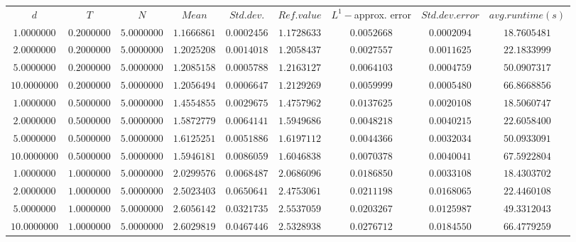 \begin{tabular}{ccccccccc}
$d$ & $T$ & $N$ & $Mean$ & $Std. dev.$ & $Ref. value$ & $L^1-$approx. error & $Std. dev. error$ & $avg. runtime (s)$\\
$1.0000000$ & $0.2000000$ & $5.0000000$ & $1.1666861$ & $0.0002456$ & $1.1728633$ & $0.0052668$ & $0.0002094$ & $18.7605481$\\
$2.0000000$ & $0.2000000$ & $5.0000000$ & $1.2025208$ & $0.0014018$ & $1.2058437$ & $0.0027557$ & $0.0011625$ & $22.1833999$\\
$5.0000000$ & $0.2000000$ & $5.0000000$ & $1.2085158$ & $0.0005788$ & $1.2163127$ & $0.0064103$ & $0.0004759$ & $50.0907317$\\
$10.0000000$ & $0.2000000$ & $5.0000000$ & $1.2056494$ & $0.0006647$ & $1.2129269$ & $0.0059999$ & $0.0005480$ & $66.8668856$\\
$1.0000000$ & $0.5000000$ & $5.0000000$ & $1.4554855$ & $0.0029675$ & $1.4757962$ & $0.0137625$ & $0.0020108$ & $18.5060747$\\
$2.0000000$ & $0.5000000$ & $5.0000000$ & $1.5872779$ & $0.0064141$ & $1.5949686$ & $0.0048218$ & $0.0040215$ & $22.6058400$\\
$5.0000000$ & $0.5000000$ & $5.0000000$ & $1.6125251$ & $0.0051886$ & $1.6197112$ & $0.0044366$ & $0.0032034$ & $50.0933091$\\
$10.0000000$ & $0.5000000$ & $5.0000000$ & $1.5946181$ & $0.0086059$ & $1.6046838$ & $0.0070378$ & $0.0040041$ & $67.5922804$\\
$1.0000000$ & $1.0000000$ & $5.0000000$ & $2.0299576$ & $0.0068487$ & $2.0686096$ & $0.0186850$ & $0.0033108$ & $18.4303702$\\
$2.0000000$ & $1.0000000$ & $5.0000000$ & $2.5023403$ & $0.0650641$ & $2.4753061$ & $0.0211198$ & $0.0168065$ & $22.4460108$\\
$5.0000000$ & $1.0000000$ & $5.0000000$ & $2.6056142$ & $0.0321735$ & $2.5537059$ & $0.0203267$ & $0.0125987$ & $49.3312043$\\
$10.0000000$ & $1.0000000$ & $5.0000000$ & $2.6029819$ & $0.0467446$ & $2.5328938$ & $0.0276712$ & $0.0184550$ & $66.4779259$\\
\end{tabular}
